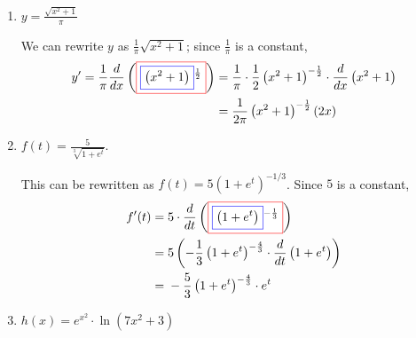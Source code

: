 \documentclass{article}
\begin{document}
\begin{enumerate}
\begin{enumerate}
  \item
    \begin{problem}[\vfill]
      $y = \displaystyle \frac{\sqrt{x^2 + 1}}{\pi}$
    \end{problem}

    \begin{solution}
      We can rewrite $y$ as $\frac{1}{\pi} \sqrt{x^2 + 1}$; since
      $\frac{1}{\pi}$ is a constant,
      \begin{align*}
        y' = {} \frac{1}{\pi} \frac{d}{dx}
        \left(\fcolorbox{red}{white}{$\displaystyle
            \fcolorbox{blue}{white}{$\displaystyle  \left(x^2 + 1
              \right)$}^ { \frac{1}{2}} $}\right) = {} & \frac{1}{\pi} \cdot
        \frac{1}{2}
        \left(x^2 + 1 \right)^ { -\frac{1}{2}} \cdot
        \frac{d}{dx}\left(x^2 + 1 \right) \\ 
        = {} & \frac{1}{2\pi} \left(x^2 + 1 \right)^ { -\frac{1}{2}}
        \left(2x \right) 
      \end{align*}
    \end{solution}

\begin{problemonly}
    \newpage
\end{problemonly}
  \item
    \begin{problem}[\vfill]
      $f(t) = \displaystyle \frac{5}{\sqrt[3]{1 + e^t}}$.  
    \end{problem}

    \begin{solution}
      This can be rewritten as $f(t) = 5 (1 + e^t)^{-1/3}$.  Since $5$ is
      a constant, 
      \begin{align*}
        f'(t) = {} & 5\cdot \frac{d}{dt} \left(\fcolorbox{red}{white}{$\displaystyle \fcolorbox{blue}{white}{$\displaystyle  \left(1+ e^ { t} \right)$}^ { -\frac{1}{3}} $}\right) \\
        = {} & 5 \left(-\frac{1}{3} \left(1+ e^ { t} \right)^ { -\frac{4}{3}} \cdot \frac{d}{dt}\left(1+ e^ { t} \right)\right) \\
        = {} & -\frac{5}{3} \left(1+ e^ { t} \right)^ { -\frac{4}{3}}
        \cdot e^ { t} 
      \end{align*}
    \end{solution}

  \item
    \begin{problem}[\vfill]
      $h(x) = e^{x^2} \cdot \ln (7x^2 + 3)$
    \end{problem}


\end{enumerate}
\end{enumerate}
\end{document}
